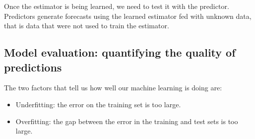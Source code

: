 \documentclass[12pt]{report}
\begin{document}
Once the estimator is being learned, we need to test it with the predictor. Predictors generate forecasts using the learned estimator fed with unknown  data, that is data that were not used to train the estimator.


\subsection{Model evaluation: quantifying the quality of predictions }
The two factors that tell us how well our machine learning is doing are:
\begin{itemize}
\item Underfitting: the error on the training set is too large.
\item Overfitting: the gap between the error in the training and test sets is too large. 
\end{itemize}
\end{document}
